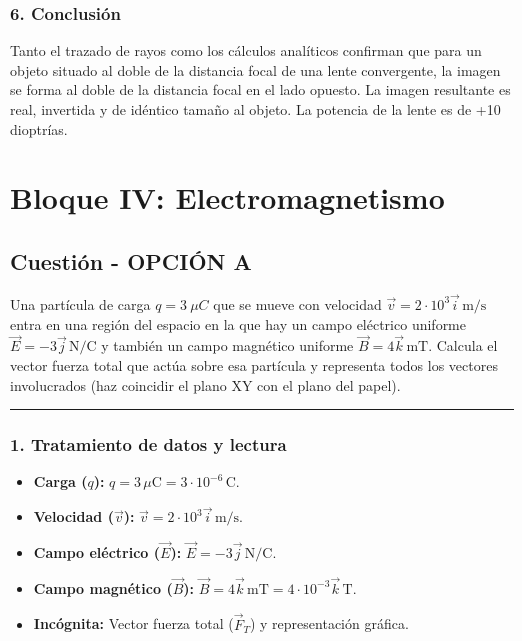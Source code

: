 \subsubsection*{6. Conclusión}
\begin{cajaconclusion}
Tanto el trazado de rayos como los cálculos analíticos confirman que para un objeto situado al doble de la distancia focal de una lente convergente, la imagen se forma al doble de la distancia focal en el lado opuesto. La imagen resultante es real, invertida y de idéntico tamaño al objeto. La potencia de la lente es de +10 dioptrías.
\end{cajaconclusion}
\newpage

\section{Bloque IV: Electromagnetismo}
\label{sec:em_2017_jun_ord}

\subsection{Cuestión - OPCIÓN A}
\label{subsec:B4A_2017_jun_ord}
\begin{cajaenunciado}
Una partícula de carga $q=3~\mu C$ que se mueve con velocidad $\vec{v}=2\cdot10^{3}\vec{i}\,\text{m/s}$ entra en una región del espacio en la que hay un campo eléctrico uniforme $\vec{E}=-3\vec{j}\,\text{N/C}$ y también un campo magnético uniforme $\vec{B}=4\vec{k}\,\text{mT}$. Calcula el vector fuerza total que actúa sobre esa partícula y representa todos los vectores involucrados (haz coincidir el plano XY con el plano del papel).
\end{cajaenunciado}
\hrule

\subsubsection*{1. Tratamiento de datos y lectura}
\begin{itemize}
    \item \textbf{Carga ($q$):} $q = 3\,\mu\text{C} = 3 \cdot 10^{-6}\,\text{C}$.
    \item \textbf{Velocidad ($\vec{v}$):} $\vec{v} = 2 \cdot 10^3 \vec{i}\,\text{m/s}$.
    \item \textbf{Campo eléctrico ($\vec{E}$):} $\vec{E} = -3\vec{j}\,\text{N/C}$.
    \item \textbf{Campo magnético ($\vec{B}$):} $\vec{B} = 4\vec{k}\,\text{mT} = 4 \cdot 10^{-3} \vec{k}\,\text{T}$.
    \item \textbf{Incógnita:} Vector fuerza total ($\vec{F}_T$) y representación gráfica.
\end{itemize}

